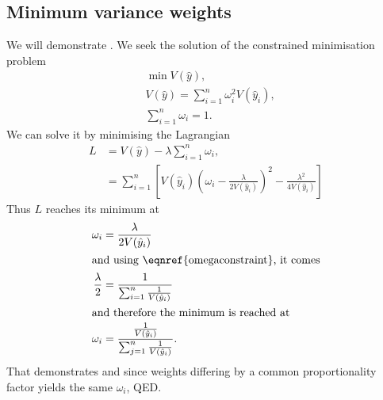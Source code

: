 \documentclass[11pt]{article}
\begin{document}
\begin{appendices}
\section{Minimum variance weights}
\label{apendixa}

We will demonstrate . We seek the solution of the constrained minimisation problem
\begin{align}
&\min V(\hat{y}),\\
&V(\hat{y}) = \sum_{i=1}^n \omega_i^2 V(\hat{y}_i),\\
&\sum_{i=1}^n \omega_i = 1.
\label{eqn:omegaconstraint}
\end{align}
We can solve it by minimising the Lagrangian
\begin{align}
L &= V(\hat{y}) - \lambda \sum_{i=1}^n \omega_i,\\
  &= \sum_{i=1}^n \left[V(\hat{y}_i)\left(\omega_i - \frac{\lambda}{2V(\hat{y}_i)} \right)^2 - \frac{\lambda^2}{4V(\hat{y}_i)} \right]
\end{align}
Thus $L$ reaches its minimum at
\begin{align}
\omega_i &= \frac{\lambda}{2V(\hat{y}_i)}\\
\intertext{and using \eqnref{omegaconstraint}, it comes}
\frac{\lambda}{2} &= \frac{1}{\sum_{i=1}^n \frac{1}{V(\hat{y}_i)}}\\
\intertext{and therefore the minimum is reached at}
\omega_i &= \frac{\frac{1}{V(\hat{y}_i)}}{\sum_{j=1}^n \frac{1}{V(\hat{y}_i)}}.
\end{align}
That demonstrates  and since weights differing by a common proportionality factor yields the same $\omega_i$, QED.


\end{appendices}
\end{document}
